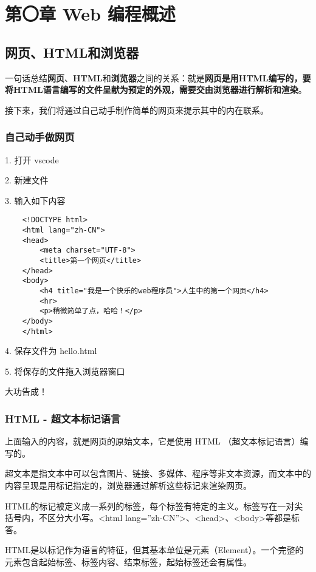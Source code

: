 \chapter{第〇章 Web 编程概述}

\section{网页、HTML和浏览器}

一句话总结{\textbf{网页}}、{\textbf{HTML}}和{\textbf{浏览器}}之间的关系：就是{\textbf{网页是用HTML编写的，要将HTML语言编写的文件呈献为预定的外观，需要交由浏览器进行解析和渲染}}。

接下来，我们将通过自己动手制作简单的网页来提示其中的内在联系。

\subsection{自己动手做网页}

1. 打开 vscode

2. 新建文件

3. 输入如下内容

\begin{verbatim}
    <!DOCTYPE html>
    <html lang="zh-CN">
    <head>
        <meta charset="UTF-8">
        <title>第一个网页</title>
    </head>
    <body>
        <h4 title="我是一个快乐的web程序员">人生中的第一个网页</h4>
        <hr>
        <p>稍微简单了点，哈哈！</p>
    </body>
    </html>
\end{verbatim}

4. 保存文件为 hello.html

5. 将保存的文件拖入浏览器窗口

大功告成！

\subsection{HTML - 超文本标记语言}

上面输入的内容，就是网页的原始文本，它是使用 HTML （超文本标记语言）编写的。

超文本是指文本中可以包含图片、链接、多媒体、程序等非文本资源，而文本中的内容呈现是用标记指定的，浏览器通过解析这些标记来渲染网页。

HTML的标记被定义成一系列的标签，每个标签有特定的主义。标签写在一对尖括号内，不区分大小写。<html lang=''zh-CN''>、<head>、<body>等都是标答。

HTML是以标记作为语言的特征，但其基本单位是元素（Element）。一个完整的元素包含起始标签、标签内容、结束标签，起始标签还会有属性。

